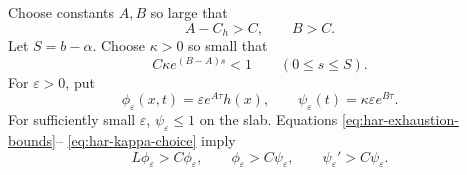 \documentclass[10pt]{coll-l}
\theoremstyle{definition}
\theoremstyle{remark}
\numberwithin{section}{chapter}
\numberwithin{equation}{chapter}
\begin{document}
Choose constants $A,B$ so large that
\begin{equation}
        A-C_h>C,\qquad B>C.                              \label{eq:har-AB-choice}
\end{equation}
Let $S=b-\alpha$.  Choose $\kappa>0$ so small that
\begin{equation}
  C\kappa e^{(B-A)s}<1
       \qquad(0\leq s\leq S).                           \label{eq:har-kappa-choice}
\end{equation}
For $\varepsilon>0$, put
\begin{equation}
 \phi_\varepsilon(x,t)=\varepsilon e^{A\tau}h(x),
 \qquad
 \psi_\varepsilon(t)=\kappa\varepsilon e^{B\tau}.       \label{eq:har-barrier-functions}
\end{equation}
For sufficiently small $\varepsilon$, $\psi_\varepsilon\leq1$ on the slab.
Equations \eqref{eq:har-exhaustion-bounds}--
\eqref{eq:har-kappa-choice} imply
\begin{equation}
 L\phi_\varepsilon>C\phi_\varepsilon,\qquad
 \phi_\varepsilon>C\psi_\varepsilon,\qquad
 \psi_\varepsilon'>C\psi_\varepsilon.                  \label{eq:har-strict-barrier-ineq}
\end{equation}
\end{document}
